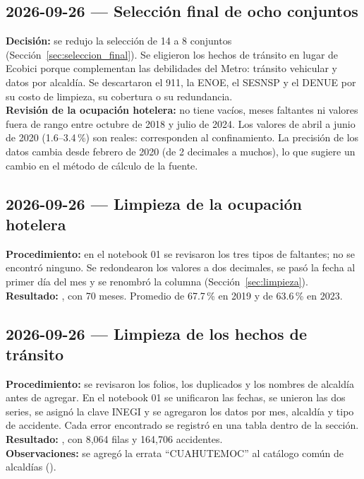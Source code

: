 \subsection{2026-09-26 --- Selección final de ocho conjuntos}
\textbf{Decisión:} se redujo la selección de 14 a 8 conjuntos (Sección~\ref{sec:seleccion_final}). Se
eligieron los hechos de tránsito en lugar de Ecobici porque complementan las debilidades del Metro:
tránsito vehicular y datos por alcaldía. Se descartaron el 911, la ENOE, el SESNSP y el DENUE por su
costo de limpieza, su cobertura o su redundancia.\\
\textbf{Revisión de la ocupación hotelera:} no tiene vacíos, meses faltantes ni valores fuera de rango
entre octubre de 2018 y julio de 2024. Los valores de abril a junio de 2020 (1.6--3.4\,\%) son reales:
corresponden al confinamiento. La precisión de los datos cambia desde febrero de 2020 (de 2 decimales
a muchos), lo que sugiere un cambio en el método de cálculo de la fuente.

\subsection{2026-09-26 --- Limpieza de la ocupación hotelera}
\textbf{Procedimiento:} en el notebook 01 se revisaron los tres tipos de faltantes; no se encontró
ninguno. Se redondearon los valores a dos decimales, se pasó la fecha al primer día del mes y se
renombró la columna (Sección~\ref{sec:limpieza}).\\
\textbf{Resultado:} , con 70 meses. Promedio de 67.7\,\% en 2019 y de
63.6\,\% en 2023.

\subsection{2026-09-26 --- Limpieza de los hechos de tránsito}
\textbf{Procedimiento:} se revisaron los folios, los duplicados y los nombres de alcaldía antes de
agregar. En el notebook 01 se unificaron las fechas, se unieron las dos series, se asignó la clave
INEGI y se agregaron los datos por mes, alcaldía y tipo de accidente. Cada error encontrado se
registró en una tabla dentro de la sección.\\
\textbf{Resultado:} , con 8,064 filas y 164,706 accidentes.\\
\textbf{Observaciones:} se agregó la errata \enquote{CUAHUTEMOC} al catálogo común de alcaldías
().

